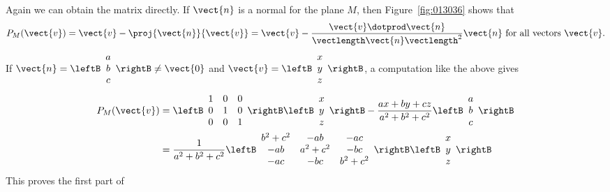 Again we can obtain the matrix directly. If $\vect{n}$ is a normal for the plane $M$, then Figure~\ref{fig:013036} shows that
\begin{equation*}
P_{M}(\vect{v}) = \vect{v} - \proj{\vect{n}}{\vect{v}} =  \vect{v} - \frac{\vect{v} \dotprod \vect{n}}{\vectlength \vect{n} \vectlength^2}\vect{n} \mbox{ for all vectors }\vect{v}.
\end{equation*}
If 
$\vect{n} = \leftB
\begin{array}{c}
a \\
b \\
c
\end{array}
\rightB \neq \vect{0}$
 and 
$\vect{v} = \leftB
\begin{array}{c}
x \\
y \\
z
\end{array}
\rightB$, a computation like the above gives
\begin{align*}
P_{M}(\vect{v}) &=  
\leftB
\begin{array}{ccc}
1 & 0 & 0 \\
0 & 1 & 0 \\
0 & 0 & 1
\end{array}
\rightB
\leftB
\begin{array}{c}
x \\
y \\
z
\end{array}
\rightB 
- \frac{ax + by + cz}{a^2 + b^2 + c^2} \leftB
\begin{array}{c}
a \\
b \\
c
\end{array}
\rightB 
\\
&=
\frac{1}{a^2 + b^2 + c^2} \leftB
\begin{array}{ccc}
b^2 + c^2 & -ab & -ac \\
-ab & a^2 + c^2 & -bc \\
-ac & -bc & b^2 + c^2 
\end{array}
\rightB  \leftB
\begin{array}{c}
x \\
y \\
z
\end{array}
\rightB
\end{align*}
This proves the first part of

